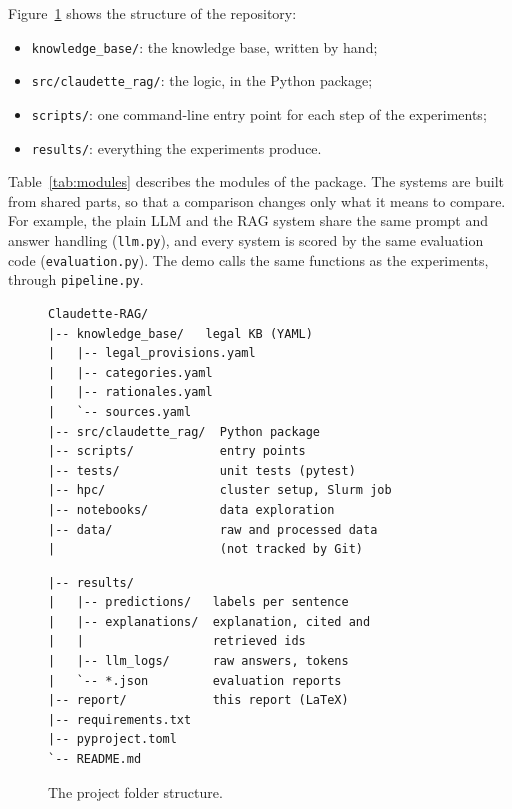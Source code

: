 Figure~\ref{fig:folders} shows the structure of the repository:
\begin{itemize}
  \item \texttt{knowledge\_base/}: the knowledge base, written by hand;
  \item \texttt{src/claudette\_rag/}: the logic, in the Python package;
  \item \texttt{scripts/}: one command-line entry point for each step of the experiments;
  \item \texttt{results/}: everything the experiments produce.
\end{itemize}
Table~\ref{tab:modules} describes the modules of the package. The systems are built from shared parts, so that a comparison changes only what it means to compare. For example, the plain LLM and the RAG system share the same prompt and answer handling (\texttt{llm.py}), and every system is scored by the same evaluation code (\texttt{evaluation.py}). The demo calls the same functions as the experiments, through \texttt{pipeline.py}.

\begin{figure}[ht]
\centering\small
\begin{minipage}[t]{0.48\textwidth}
\begin{verbatim}
Claudette-RAG/
|-- knowledge_base/   legal KB (YAML)
|   |-- legal_provisions.yaml
|   |-- categories.yaml
|   |-- rationales.yaml
|   `-- sources.yaml
|-- src/claudette_rag/  Python package
|-- scripts/            entry points
|-- tests/              unit tests (pytest)
|-- hpc/                cluster setup, Slurm job
|-- notebooks/          data exploration
|-- data/               raw and processed data
|                       (not tracked by Git)
\end{verbatim}
\end{minipage}\hfill
\begin{minipage}[t]{0.48\textwidth}
\begin{verbatim}
|-- results/
|   |-- predictions/   labels per sentence
|   |-- explanations/  explanation, cited and
|   |                  retrieved ids
|   |-- llm_logs/      raw answers, tokens
|   `-- *.json         evaluation reports
|-- report/            this report (LaTeX)
|-- requirements.txt
|-- pyproject.toml
`-- README.md
\end{verbatim}
\end{minipage}
\caption{The project folder structure.}
\label{fig:folders}
\end{figure}

